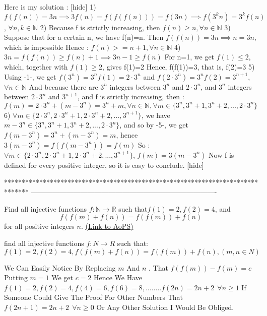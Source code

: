 \begin{solution}
	Here is my solution :
[hide]
1) $f(f(n))=3n \implies 3f(n)=f(f(f(n)))=f(3n) \implies f(3^k n)=3^k f(n)$, $\forall n,k \in \mathbb{N}$
2) Because f is strictly increasing, then $f(n) \geq n, \forall n\in \mathbb{N}$
3) Suppose that for a certain n, we have f(n)=n. Then $f(f(n))=3n \implies n=3n$, which is impossible
Hence : $f(n)>=n+1, \forall n \in \mathbb{N}$
4) $3n=f(f(n))\geq f(n)+1 \implies 3n-1 \geq f(n)$
For n=1, we get $f(1)\leq 2$, which, together with $f(1) \geq 2$, gives f(1)=2
Hence, f(f(1))=3, that is, f(2)=3
5) Using -1-, we get $f(3^n)=3^nf(1)=2\cdot 3^n$ and $f(2\cdot 3^n) = 3^n f(2) = 3^{n+1}$, $\forall n \in \mathbb{N}$
And because there are $3^n$ integers between $3^n$ and $2 \cdot 3^n$, and $3^n$ integers between $2\cdot 3^n$ and $3^{n+1}$, and f is strictly increasing, then : $f(m)=2\cdot 3^n + (m - 3^n) = 3^n + m, \forall n \in \mathbb{N}, \forall m \in \{3^n, 3^n+1, 3^n+2, ..., 2 \cdot 3^n\}$
6) $\forall  m \in \{2 \cdot 3^n,  2 \cdot 3^n+1, 2 \cdot 3^n+2, ...,3^{n+1}\}$, we have $m-3^n \in \{3^n, 3^n+1, 3^n+2, ..., 2 \cdot 3^n\}$, and so by -5-, we get $f(m-3^n)=3^n + (m-3^n)=m$, hence $3(m-3^n)=f(f(m-3^n))=f(m)$
So :  $\forall  m \in \{2 \cdot 3^n,  2 \cdot 3^n+1, 2 \cdot 3^n+2, ..., 3^{n+1}\}$, $f(m)=3(m-3^n)$
Now f is defined for every positive integer, so it is easy to conclude.
[\/hide]
\end{solution}
*******************************************************************************
-------------------------------------------------------------------------------

\begin{problem}
	Find all injective functions $f: \mathbb N\to \mathbb R$ such that$f(1)=2,f(2)=4$, and
\[f(f(m)+f(n))=f(f(m))+f(n)\]
for all positive integers $n$.
	\flushright \href{https://artofproblemsolving.com/community/c6h390689}{(Link to AoPS)}
\end{problem}



\begin{solution}
	\begin{tcolorbox}find all  injective functions $f:N\rightarrow R$ such that:
$f(1)=2,f(2)=4,f(f(m)+f(n))=f(f(m))+f(n),  (m,n\in N)$\end{tcolorbox}
We Can Easily Notice By Replacing $m$ And $n$ .
That 
$f(f(m))-f(m)=c$
Putting $m=1$
We get $c=2$
Hence We Have $f(1)=2,f(2)=4,f(4)=6,f(6)=8,........f(2n)=2n+2~~\forall n\ge1$
If Someone Could Give The Proof For Other Numbers That 
$f(2n+1)=2n+2~~\forall n\ge 0$ 
Or Any Other Solution I Would Be Obliged.
\end{solution}



